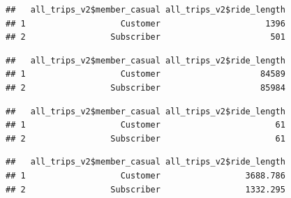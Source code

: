 \documentclass[
]{article}
\newenvironment{Shaded}{\begin{snugshade}}{\end{snugshade}}
\newcommand{\AttributeTok}[1]{\textcolor[rgb]{0.13,0.29,0.53}{#1}}
\newcommand{\FunctionTok}[1]{\textcolor[rgb]{0.13,0.29,0.53}{\textbf{#1}}}
\newcommand{\NormalTok}[1]{#1}
\newcommand{\SpecialCharTok}[1]{\textcolor[rgb]{0.81,0.36,0.00}{\textbf{#1}}}
\begin{document}
\begin{verbatim}
##   all_trips_v2$member_casual all_trips_v2$ride_length
## 1                   Customer                     1396
## 2                 Subscriber                      501
\end{verbatim}

\begin{Shaded}
\end{Shaded}

\begin{verbatim}
##   all_trips_v2$member_casual all_trips_v2$ride_length
## 1                   Customer                    84589
## 2                 Subscriber                    85984
\end{verbatim}

\begin{Shaded}
\end{Shaded}

\begin{verbatim}
##   all_trips_v2$member_casual all_trips_v2$ride_length
## 1                   Customer                       61
## 2                 Subscriber                       61
\end{verbatim}

\begin{Shaded}
\end{Shaded}

\begin{verbatim}
##   all_trips_v2$member_casual all_trips_v2$ride_length
## 1                   Customer                 3688.786
## 2                 Subscriber                 1332.295
\end{verbatim}
\end{document}
